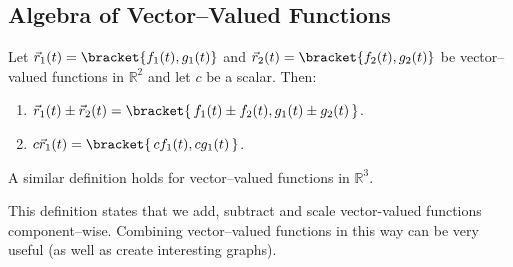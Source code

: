 \subsection*{Algebra of Vector--Valued Functions}

{Let $\vec r_1(t)=\bracket{f_1(t),g_1(t)}$ and $\vec r_2(t)=\bracket{f_2(t),g_2(t)}$ be vector--valued functions in $\mathbb{R}^2$ and let $c$ be a scalar. Then:
\begin{enumerate}
	\item $\vec r_1(t) \pm \vec r_2(t) =\bracket{\, f_1(t)\pm f_2(t),g_1(t)\pm g_2(t)\,}$.
	\item	$c\vec r_1(t) =\bracket{\, cf_1(t),cg_1(t)\,}$.
\end{enumerate}
A similar definition holds for vector--valued functions in $\mathbb{R}^3$.
}

This definition states that we add, subtract and scale vector-valued functions component--wise. Combining vector--valued functions in this way can be very useful (as well as create interesting graphs).


